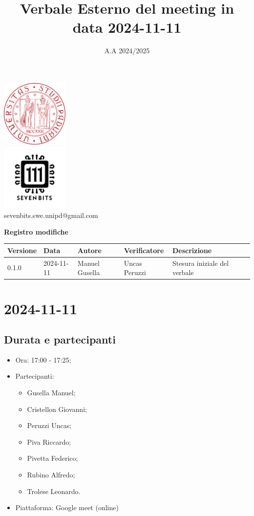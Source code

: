 \documentclass[12pt]{article}
\title{Verbale Esterno del meeting in data 2024-11-11}
\date{A.A 2024/2025}
\begin{document}
\maketitle
\begin{center}
\includegraphics[width=0.25\textwidth]{LogoUnipd}\\
\includegraphics[width=0.25\textwidth]{Sevenbitslogo}\\
sevenbits.swe.unipd@gmail.com\\
\vspace{2mm}

\textbf{Registro modifiche}\\
\vspace{2mm}
\begin{tabular}{|l|l|l|l|l|l|}
\hline
\textbf{Versione} & \textbf{Data} & \textbf{Autore} & \textbf{Verificatore} & \textbf{Descrizione} \\
\hline
0.1.0 & 2024-11-11 & Manuel Gusella & Uncas Peruzzi & Stesura iniziale del verbale\\
\hline
\end{tabular}
\end{center}
\newpage
\tableofcontents
\newpage
\section{2024-11-11}
\subsection{Durata e partecipanti}
\begin{itemize}
\item Ora: 17:00 - 17:25;
\item Partecipanti: 	
	\begin{itemize}
	\item Gusella Manuel;
	\item Cristellon Giovanni;
	\item Peruzzi Uncas;
	\item Piva Riccardo;
	\item Pivetta Federico;
	\item Rubino Alfredo;
	\item Trolese Leonardo.
	\end{itemize}
\item Piattaforma: Google meet (online)
\end{itemize}
\end{document}
